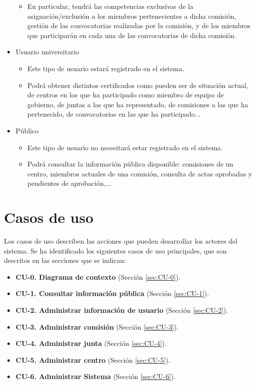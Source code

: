 \begin{itemize}
\begin{itemize}
               \item En particular, tendrá las competencias exclusivas de la asignación/exclusión a los miembros pertenecientes a dicha comisión, gestión de las convocatorias realizadas por la comisión, y de los miembros que participarán en cada una de las convocatorias de dicha comisión.
            \end{itemize}
        \item Usuario universitario
            \begin{itemize}
                \item Este tipo de usuario estará registrado en el sistema.
                \item Podrá obtener distintos certificados como pueden ser de situación actual, de centros en los que ha participado como miembro de equipo de gobierno, de juntas a las que ha representado, de comisiones a las que ha pertenecido, de convocatorias en las que ha participado...
              \end{itemize}
        \item Público
        \begin{itemize}
              \item Este tipo de usuario no necesitará estar registrado en el sistema.
              \item Podrá consultar la información pública disponible: comisiones de un centro, miembros actuales de una comisión, consulta de actas aprobadas y pendientes de aprobación,...
          \end{itemize}
     \end{itemize}

\section{Casos de uso}

  Los casos de uso describen las acciones que pueden desarrollar los actores del sistema. Se ha identificado los siguientes casos de uso principales, que son descritos en las secciones que se indican:
    \begin{itemize}
    \item \textbf{CU-0. Diagrama de contexto} (Sección \ref{sec:CU-0}).  
    \item \textbf{CU-1. Consultar información pública} (Sección \ref{sec:CU-1}). 
    \item \textbf{CU-2. Administrar información de usuario} (Sección \ref{sec:CU-2}).
    \item \textbf{CU-3. Administrar comisión} (Sección \ref{sec:CU-3}).
    \item \textbf{CU-4. Administrar junta} (Sección \ref{sec:CU-4}).
    \item \textbf{CU-5. Administrar centro} (Sección \ref{sec:CU-5}).
    \item \textbf{CU-6. Administrar Sistema} (Sección \ref{sec:CU-6}).
\end{itemize}

